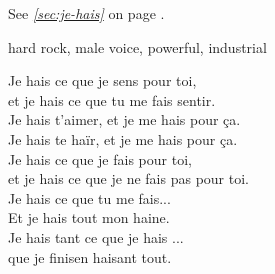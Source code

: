 

\begin{notes}
See \emph{\ref{sec:je-hais}} on page \pageref{sec:je-hais}.
\end{notes}

\begin{style}
hard rock, male voice, powerful, industrial
\end{style}
\begin{lyrics}
Je hais ce que je sens pour toi,\\
et je hais ce que tu me fais sentir.\\
Je hais t'aimer, et je me hais pour ça.\\
Je hais te haïr, et je me hais pour ça.\\
Je hais ce que je fais pour toi,\\
et je hais ce que je ne fais pas pour toi.\\
Je hais ce que tu me fais...\\
Et je hais tout mon haine.\\
Je hais tant ce que je hais ...\\
que je finisen haisant tout.
\end{lyrics}

